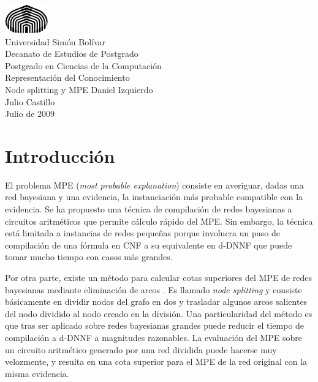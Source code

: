 \documentclass[11pt, letterpaper]{article}
\begin{document}

\thispagestyle{empty}

\noindent 
\begin{center}
  \includegraphics[width=5em]{cebolla.png}\\
  Universidad Simón Bolívar\\
  Decanato de Estudios de Postgrado\\
  Postgrado en Ciencias de la Computación\\
  Representación del Conocimiento \\
  \vfill
  {\Huge Node splitting y MPE}
  \vfill
  Daniel Izquierdo \\
  Julio Castillo\\[2em]
  Julio de 2009
\end{center}

\newpage

\section{Introducción}

El problema MPE (\emph{most probable explanation}) consiste en averiguar, dadas
una red bayesiana y una evidencia, la instanciación más probable compatible con
la evidencia. Se ha propuesto \cite{Darwiche01alogical} una técnica de
compilación de redes bayesianas a circuitos aritméticos que permite cálculo
rápido del MPE. Sin embargo, la técnica está limitada a instancias de redes
pequeñas porque involucra un paso de compilación de una fórmula en CNF a su
equivalente en d-DNNF que puede tomar mucho tiempo con casos más grandes.

Por otra parte, existe un método para calcular cotas superiores del
MPE de redes bayesianas mediante eliminación de arcos
\cite{ChoiChaviraDarwiche07}. Es llamado \emph{node splitting} y
consiste básicamente en dividir nodos del grafo en dos y trasladar algunos
arcos salientes del nodo dividido al nodo creado en la división. Una
particularidad del método es que tras ser aplicado sobre redes bayesianas
grandes puede
reducir el tiempo de compilación a d-DNNF a magnitudes razonables. La
evaluación del MPE sobre un circuito aritmético generado por una red dividida
puede hacerse muy velozmente, y resulta en una cota superior para el MPE de la
red original con la misma evidencia.
\end{document}
